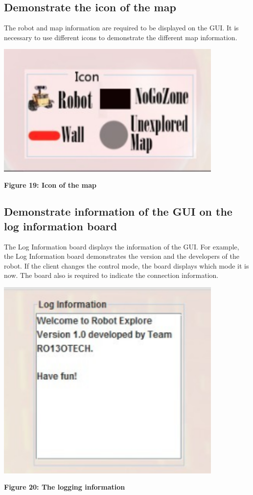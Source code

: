 \documentclass[11pt, a4paper]{report}
\begin{document}
\subsection{Demonstrate the icon of the map}
The robot and map information are required to be displayed on the GUI. It is necessary to use different icons to demonstrate the different map information.
  \begin{center}
 \includegraphics[width=11.20cm]{icon}
\end{center}
\begin{center}
\textbf {Figure 19: Icon of the map} \\[0.3cm]
\end{center}
\subsection{Demonstrate information of the GUI on the log information board}
The Log Information board displays the information of the GUI. For example, the Log Information board demonstrates the version and the developers of the robot. If the client changes the control mode, the board displays which mode it is now. The board also is required to indicate the connection information.
  \begin{center}
 \includegraphics[width=11.20cm]{board}
\end{center}
\begin{center}
\textbf {Figure 20: The logging information} \\[0.3cm]
\end{center}  
\end{document}
